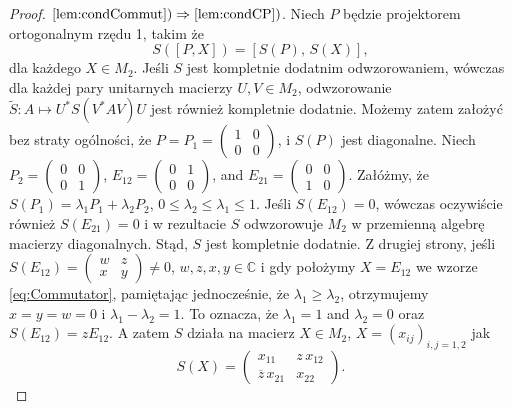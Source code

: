 \begin{proof}
$\ref{lem:condCommut}) \Rightarrow \ref{lem:condCP})$.
Niech $P$ będzie projektorem ortogonalnym rzędu 1, takim że
\begin{equation}
\label{eq:Commutator}
S([P,X]) = [S(P), \, S(X)],
\end{equation}
dla każdego $X \in M_{2}$.
Jeśli $S$ jest kompletnie dodatnim odwzorowaniem, wówczas dla każdej pary
unitarnych macierzy $U, V \in M_{2}$,
odwzorowanie $\tilde{S}: A \mapsto U^{*} S(V^{*} A V) U$
jest również kompletnie dodatnie.
Możemy zatem założyć bez straty ogólności, że
$P = P_{1} =
\left(
\begin{smallmatrix} 1 & 0 \\ 0 & 0 \end{smallmatrix}
\right)$,
i $S(P)$ jest diagonalne.
Niech $P_{2} = \left(
\begin{smallmatrix} 0 & 0 \\ 0 & 1 \end{smallmatrix}
\right)$,
$E_{12} =
\left(
\begin{smallmatrix} 0 & 1 \\ 0 & 0 \end{smallmatrix}
\right)$,
and
$E_{21} =
\left(
\begin{smallmatrix} 0 & 0 \\ 1 & 0 \end{smallmatrix}
\right)$.
Załóżmy, że
$S(P_{1}) = \lambda_{1} P_{1} + \lambda_{2} P_{2}$,
$0 \leq \lambda_{2} \leq \lambda_{1} \leq 1$.
Jeśli $S(E_{12}) = 0$,
wówczas oczywiście również $S(E_{21}) = 0$ i w rezultacie
$S$ odwzorowuje $M_{2}$
w przemienną algebrę macierzy diagonalnych.
Stąd, $S$ jest kompletnie dodatnie.
Z drugiej strony, jeśli
$S(E_{12}) =
\left(
\begin{smallmatrix} w & z \\ x & y \end{smallmatrix}
\right) \neq 0$,
$w, z, x, y \in \mathbb{C}$
i gdy położymy $X = E_{12}$ we wzorze \eqref{eq:Commutator},
pamiętając jednocześnie, że $\lambda_{1} \geq \lambda_{2}$,
otrzymujemy $x = y = w = 0$ i $\lambda_{1} - \lambda_{2} = 1$.
To oznacza, że $\lambda_{1} = 1$ and $\lambda_{2} = 0$ oraz
$S(E_{12}) = z E_{12}$.
A zatem $S$ działa na macierz
$X \in M_{2}$, $X = (x_{ij})_{i,j=1,2}$ jak
\begin{equation}
S(X) = \begin{pmatrix}
 x_{11} & z \, x_{12} \\
\overline{z} \, x_{21} & x_{22}
\end{pmatrix}.
\end{equation}

\end{proof}
